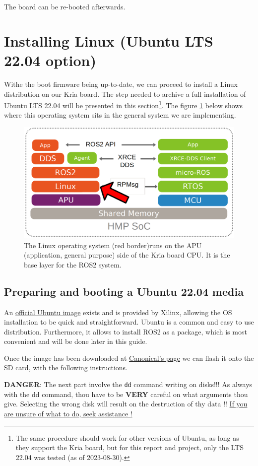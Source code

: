 \documentclass[10pt]{article}
\begin{document}
The board can be re-booted afterwards.
\pagebreak
\section{Installing Linux (Ubuntu LTS 22.04 option)}
\label{sec:org8ee4cf4}
Withe the boot firmware being up-to-date, we can proceed to install a Linux distribution
on our Kria board. The step needed to archive a full installation of Ubuntu LTS 22.04
will be presented in this section\footnote{The same procedure should work for other versions of Ubuntu, as long as they
support the Kria board, but for this report and project, only the LTS 22.04 was tested
(as of 2023-08-30).}. The figure \ref{fig:orgd7a17a2} below shows
where this operating system sits in the general system we are implementing.

\begin{figure}[htbp]
\centering
\includegraphics[width=.6\textwidth]{./img/map_linux.png}
\caption{\label{fig:orgd7a17a2}The Linux operating system (red border)runs on the APU (application, general purpose) side of the Kria board CPU. It is the base layer for the ROS2 system.}
\end{figure}

\subsection{Preparing and booting a Ubuntu 22.04 media}
\label{sec:org25c5651}
An \href{https://ubuntu.com/download/amd-xilinx}{official Ubuntu image} exists and is
provided by Xilinx, allowing the OS installation to be quick and
straightforward.
Ubuntu is a common and easy to use distribution. Furthermore,
it allows to install ROS2 as a package, which is most convenient and will be
done later in this guide.

Once the image has been downloaded at \href{https://ubuntu.com/download/amd-xilinx}{Canonical's page}
we can flash it onto the SD card, with the following instructions.

\begin{tcolorbox}[colback=red!5!white,colframe=red!75!black]
\textbf{DANGER}: The next part involve the \texttt{dd} command writing on disks!!!
As always with the dd command, thou have to be \textbf{VERY} careful on what arguments
thou give. Selecting the wrong disk will result on the destruction of
thy data !!
\uline{If you are unsure of what to do, seek assistance !}
\end{tcolorbox}
\end{document}
